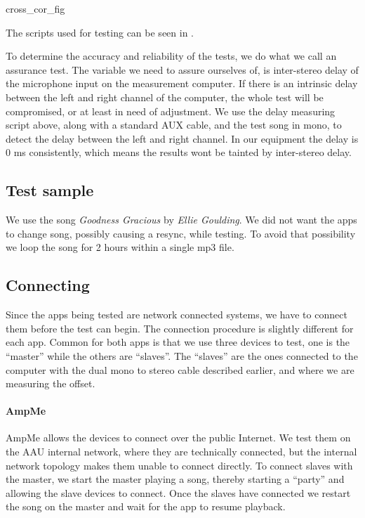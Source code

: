 {cross_cor_fig}

The scripts used for testing can be seen in .

To determine the accuracy and reliability of the tests, we do what we
call an assurance test. The variable we need to assure
ourselves of, is inter-stereo delay of the microphone input on the
measurement computer. If there is an intrinsic delay between the left and
right channel of the computer, the whole test will be
compromised, or at least in need of adjustment. We use the delay
measuring script above, along with a standard AUX cable,
and the test song in mono, to detect the delay
between the left and right channel. In our equipment the delay is 0 ms
consistently, which means the results wont be tainted by inter-stereo
delay.

\subsection{Test sample}
We use the song \textit{Goodness Gracious} by \textit{Ellie Goulding}.  We did not
want the apps to change song, possibly causing a resync, while testing.
To avoid that possibility we loop the song for 2 hours within
a single mp3 file.

\subsection{Connecting}
Since the apps being tested are network connected systems, we have to
connect them before the test can begin. The connection procedure is
slightly different for each app. Common for both apps is that we use
three devices to test, one is the ``master'' while the others are
``slaves''. The ``slaves'' are the ones connected to the computer
with the dual mono to stereo cable described earlier, and where we are
measuring the offset.

\paragraph{AmpMe}
AmpMe allows the devices to connect over the public Internet. We test
them on the AAU internal network, where they are technically connected,
but the internal network topology makes them unable to connect directly.
To connect slaves with the master, we start the master playing a song,
thereby starting a ``party'' and allowing the slave devices to
connect. Once the slaves have connected we restart the song on the
master and wait for the app to resume playback.

